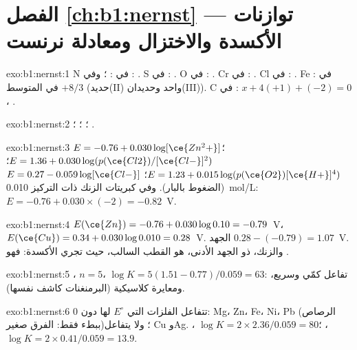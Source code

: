 \section*{الفصل \ref{ch:b1:nernst} --- توازنات الأكسدة والاختزال ومعادلة نرنست}

\begin{solution}{exo:b1:nernst:1}
N في : ؛ وفي : . S في : . O في
: . Cr في : . Cl في : . Fe في
: $+8/3$ في المتوسط (حديد(II) واحد وحديدان(III)). C في
: $x + 4(+1) + (-2) = 0$، .
\end{solution}

\begin{solution}{exo:b1:nernst:2}
؛
؛
؛
.
\end{solution}

\begin{solution}{exo:b1:nernst:3}
$E = -0.76 + 0.030\log[\ce{Zn^2+}]$؛ $E = 1.36 + 0.030\log(p(\ce{Cl2})/[\ce{Cl-}]^2)$؛
$E = 1.23 + 0.015\log(p(\ce{O2})[\ce{H+}]^4)$؛ $E = 0.27 - 0.059\log[\ce{Cl-}]$
(الضغوط بالبار). وفي كبريتات الزنك ذات التركيز \qty{0.010}{mol/L}:
$E = -0.76 + 0.030 \times (-2) = -0.82$~V.
\end{solution}

\begin{solution}{exo:b1:nernst:4}
$E(\ce{Zn}) = -0.76 + 0.030\log 0.10 = -0.79$~V، $E(\ce{Cu}) = 0.34 +
0.030\log 0.010 = 0.28$~V. الجهد $0.28 - (-0.79) = 1.07$~V. والزنك، ذو
الجهد الأدنى، هو القطب السالب، حيث تجري الأكسدة: فهو
.
\end{solution}

\begin{solution}{exo:b1:nernst:5}
، $n = 5$،
$\log K = 5(1.51 - 0.77)/0.059 = 63$: تفاعل كمّي وسريع، ومعايرة
كلاسيكية (البرمنغنات كاشف نفسها).
\end{solution}

\begin{solution}{exo:b1:nernst:6}
تتفاعل الفلزات التي $E^\circ$ لها دون 0: Mg، Zn، Fe، Ni، Pb (الرصاص
ببطء فقط: الفرق صغير)؛ ولا يتفاعل Cu وAg. ، $\log K = 2 \times 2.36/0.059 = 80$؛
، $\log K = 2 \times 0.41/0.059 = 13.9$.
\end{solution}


